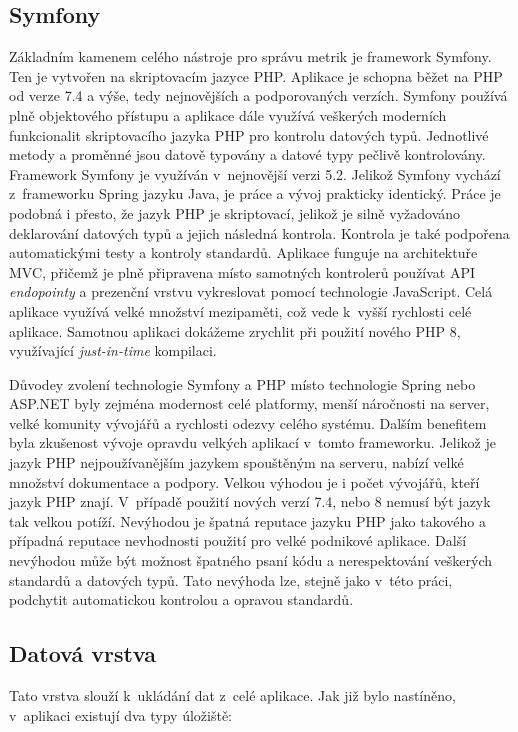 \documentclass[czech,master]{diploma}
\begin{document}

\subsection{Symfony}
\label{sec:symfony}
Základním kamenem celého nástroje pro správu metrik je framework Symfony. Ten je vytvořen na skriptovacím jazyce PHP. Aplikace je schopna běžet na PHP od verze 7.4 a výše, tedy nejnovějších a podporovaných verzích. Symfony používá plně objektového přístupu a aplikace dále využívá veškerých moderních funkcionalit skriptovacího jazyka PHP pro kontrolu datových typů. Jednotlivé metody a proměnné jsou datově typovány a datové typy pečlivě kontrolovány. Framework Symfony je využíván v~nejnovější verzi 5.2. Jelikož Symfony vychází z~frameworku Spring jazyku Java, je práce a vývoj prakticky identický. Práce je podobná i přesto, že jazyk PHP je skriptovací, jelikož je silně vyžadováno deklarování datových typů a jejich následná kontrola. Kontrola je také podpořena automatickými testy a kontroly standardů. Aplikace funguje na architektuře MVC, přičemž je plně připravena místo samotných kontrolerů používat API \textit{endopointy} a prezenční vrstvu vykreslovat pomocí technologie JavaScript. Celá aplikace využívá velké množství mezipaměti, což vede k~vyšší rychlosti celé aplikace. Samotnou aplikaci dokážeme zrychlit při použití nového PHP 8, využívající \textit{just-in-time} kompilaci.

Důvodey zvolení technologie Symfony a PHP místo technologie Spring nebo ASP.NET byly zejména modernost celé platformy, menší náročnosti na server, velké komunity vývojářů a rychlosti odezvy celého systému. Dalším benefitem byla zkušenost vývoje opravdu velkých aplikací v~tomto frameworku. Jelikož je jazyk PHP nejpoužívanějším jazykem spouštěným na serveru, nabízí velké množství dokumentace a podpory. \cite{ref:php_trend} Velkou výhodou je i počet vývojářů, kteří jazyk PHP znají.  V~případě použití nových verzí 7.4, nebo 8 nemusí být jazyk tak velkou potíží. Nevýhodou je špatná reputace jazyku PHP jako takového a případná reputace nevhodnosti použití pro velké podnikové aplikace. Další nevýhodou může být možnost špatného psaní kódu a nerespektování veškerých standardů a datových typů. Tato nevýhoda lze, stejně jako v~této práci, podchytit automatickou kontrolou a opravou standardů.

\subsection{Datová vrstva}
Tato vrstva slouží k~ukládání dat z~celé aplikace. Jak již bylo nastíněno, v~aplikaci existují dva typy úložiště:
\end{document}
